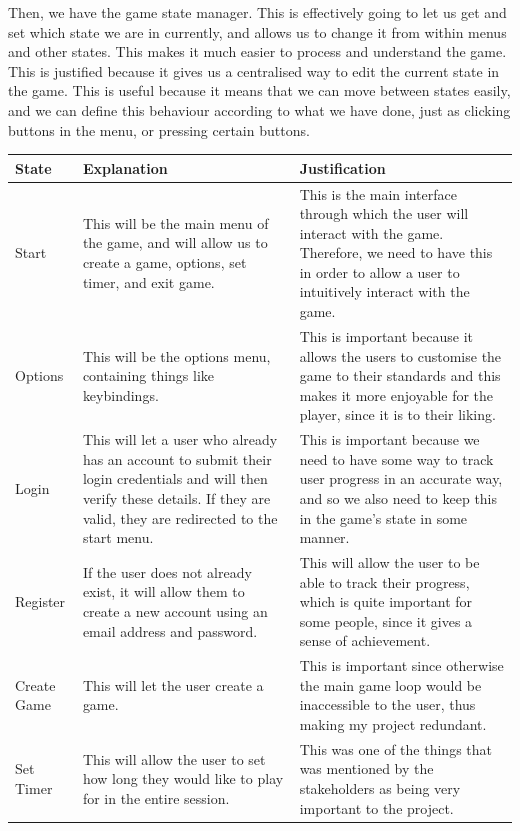 \vs
Then, we have the game state manager. This is effectively going to let us get and set which state we are in currently, and allows us to change it from within menus and other states. This makes it much easier to process and understand the game. This is justified because it gives us a centralised way to edit the current state in the game. This is useful because it means that we can move between states easily, and we can define this behaviour according to what we have done, just as clicking buttons in the menu, or pressing certain buttons.

\vs
\begin{longtable}{|p{3cm}|p{5cm}|p{7cm}|}
    \hline
    State & Explanation & Justification\\
    \hline
    \hline
    Start & This will be the main menu of the game, and will allow us to create a game, options, set timer, and exit game. & This is the main interface through which the user will interact with the game. Therefore, we need to have this in order to allow a user to intuitively interact with the game.\\
    \hline
    Options & This will be the options menu, containing things like keybindings. & This is important because it allows the users to customise the game to their standards and this makes it more enjoyable for the player, since it is to their liking.\\
    \hline
    Login & This will let a user who already has an account to submit their login credentials and will then verify these details. If they are valid, they are redirected to the start menu. & This is important because we need to have some way to track user progress in an accurate way, and so we also need to keep this in the game's state in some manner.\\
    \hline
    Register & If the user does not already exist, it will allow them to create a new account using an email address and password. & This will allow the user to be able to track their progress, which is quite important for some people, since it gives a sense of achievement.\\
    \hline
    Create Game & This will let the user create a game. & This is important since otherwise the main game loop would be inaccessible to the user, thus making my project redundant.\\
    \hline
    Set Timer & This will allow the user to set how long they would like to play for in the entire session. & This was one of the things that was mentioned by the stakeholders as being very important to the project.\\

\end{longtable}
